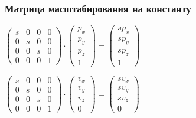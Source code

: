 \documentclass{beamer}
\begin{document}
\begin{frame}[fragile]
\frametitle{Матрица масштабирования на константу}
\begin{center}
\begin{math}
\begin{pmatrix}
s & 0 & 0 & 0 \\
0 & s & 0 & 0 \\
0 & 0 & s & 0 \\
0 & 0 & 0 & 1
\end{pmatrix}
\cdot
\begin{pmatrix}
p_x \\
p_y \\
p_z \\
1
\end{pmatrix}
=
\begin{pmatrix}
s p_x\\
s p_y\\
s p_z\\
1
\end{pmatrix}
\end{math}

\begin{math}
\begin{pmatrix}
s & 0 & 0 & 0 \\
0 & s & 0 & 0 \\
0 & 0 & s & 0 \\
0 & 0 & 0 & 1
\end{pmatrix}
\cdot
\begin{pmatrix}
v_x \\
v_y \\
v_z \\
0
\end{pmatrix}
=
\begin{pmatrix}
s v_x\\
s v_y\\
s v_z\\
0
\end{pmatrix}
\end{math}
\end{center}
\end{frame}
\end{document}
